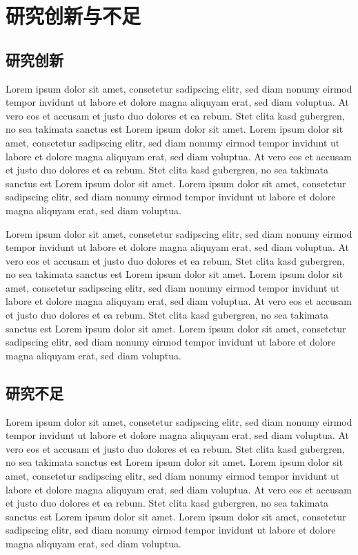 \documentclass[]{WTUthesis}
\begin{document}
	\newpage
	
	\section{研究创新与不足}
	
	\subsection{研究创新}
	
	Lorem ipsum dolor sit amet, consetetur sadipscing elitr, sed diam nonumy eirmod tempor invidunt ut labore et dolore magna aliquyam erat, sed diam voluptua. At vero eos et accusam et justo duo dolores et ea rebum. Stet clita kasd gubergren, no sea takimata sanctus est Lorem ipsum dolor sit amet. Lorem ipsum dolor sit amet, consetetur sadipscing elitr, sed diam nonumy eirmod tempor invidunt ut labore et dolore magna aliquyam erat, sed diam voluptua. At vero eos et accusam et justo duo dolores et ea rebum. Stet clita kasd gubergren, no sea takimata sanctus est Lorem ipsum dolor sit amet. Lorem ipsum dolor sit amet, consetetur sadipscing elitr, sed diam nonumy eirmod tempor invidunt ut labore et dolore magna aliquyam erat, sed diam voluptua.
	
	Lorem ipsum dolor sit amet, consetetur sadipscing elitr, sed diam nonumy eirmod tempor invidunt ut labore et dolore magna aliquyam erat, sed diam voluptua. At vero eos et accusam et justo duo dolores et ea rebum. Stet clita kasd gubergren, no sea takimata sanctus est Lorem ipsum dolor sit amet. Lorem ipsum dolor sit amet, consetetur sadipscing elitr, sed diam nonumy eirmod tempor invidunt ut labore et dolore magna aliquyam erat, sed diam voluptua. At vero eos et accusam et justo duo dolores et ea rebum. Stet clita kasd gubergren, no sea takimata sanctus est Lorem ipsum dolor sit amet. Lorem ipsum dolor sit amet, consetetur sadipscing elitr, sed diam nonumy eirmod tempor invidunt ut labore et dolore magna aliquyam erat, sed diam voluptua.
	
	\subsection{研究不足}
	
	Lorem ipsum dolor sit amet, consetetur sadipscing elitr, sed diam nonumy eirmod tempor invidunt ut labore et dolore magna aliquyam erat, sed diam voluptua. At vero eos et accusam et justo duo dolores et ea rebum. Stet clita kasd gubergren, no sea takimata sanctus est Lorem ipsum dolor sit amet. Lorem ipsum dolor sit amet, consetetur sadipscing elitr, sed diam nonumy eirmod tempor invidunt ut labore et dolore magna aliquyam erat, sed diam voluptua. At vero eos et accusam et justo duo dolores et ea rebum. Stet clita kasd gubergren, no sea takimata sanctus est Lorem ipsum dolor sit amet. Lorem ipsum dolor sit amet, consetetur sadipscing elitr, sed diam nonumy eirmod tempor invidunt ut labore et dolore magna aliquyam erat, sed diam voluptua.
	
\end{document}
